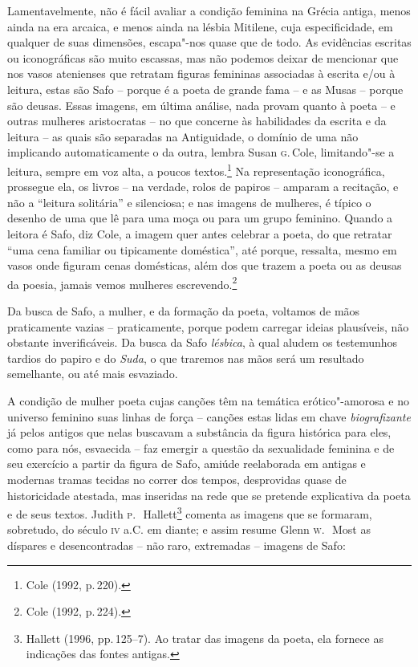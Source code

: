 Lamentavelmente, não é fácil avaliar a condição feminina na Grécia
antiga, menos ainda na era arcaica, e menos ainda na lésbia Mitilene, cuja
especificidade, em qualquer de suas dimensões, escapa"-nos quase que
de todo. As evidências escritas ou iconográficas são muito
escassas, mas não podemos deixar de mencionar que nos vasos atenienses que
retratam figuras femininas associadas à escrita e/ou à leitura, estas são Safo
-- porque é a poeta de grande fama -- e as Musas -- porque são deusas.
Essas imagens, em última análise, nada provam quanto à poeta -- e outras mulheres
aristocratas -- no que concerne às habilidades da escrita e da leitura -- as
quais são separadas na Antiguidade, o domínio de uma não implicando
automaticamente o da outra, lembra Susan \textsc{g}.\,Cole, limitando"-se a
leitura, sempre em voz alta, a poucos textos.\footnote{ Cole (1992, p.\,220).} Na representação iconográfica,
prossegue ela, os livros -- na verdade, rolos de papiros -- amparam a
recitação, e não a “leitura solitária” e silenciosa; e nas imagens de mulheres,
é típico o desenho de uma que lê para uma moça ou para um grupo feminino.
Quando a leitora é Safo, diz Cole, a imagem quer antes celebrar a poeta, do que
retratar “uma cena familiar ou tipicamente doméstica”, até porque, ressalta,
mesmo em vasos onde figuram cenas domésticas, além dos que trazem a poeta ou as
deusas da poesia, jamais vemos mulheres escrevendo.\footnote{ Cole (1992, p.\,224).}

Da busca de Safo, a mulher, e da formação da poeta, voltamos de mãos
praticamente vazias -- praticamente, porque podem carregar ideias plausíveis,
não obstante inverificáveis. Da busca da Safo \textit{lésbica}, à qual
aludem os testemunhos tardios do papiro e do \textit{Suda}, o que traremos nas
mãos será um resultado semelhante, ou até mais esvaziado.

A condição de mulher poeta cujas canções têm na temática erótico"-amorosa e no
universo feminino suas linhas de força -- canções estas lidas em chave
\textit{biografizante} já pelos antigos que nelas buscavam a substância da figura
histórica para eles, como para nós, esvaecida -- faz emergir a questão da
sexualidade feminina e de seu exercício a partir da figura de Safo,
amiúde reelaborada em antigas e modernas tramas tecidas no correr dos
tempos, desprovidas quase de historicidade atestada, mas
inseridas na rede que se pretende explicativa da poeta e de seus textos. Judith
\textsc{p}.~\,Hallett\footnote{ Hallett (1996, pp.\,125--7). Ao tratar das
imagens da poeta, ela fornece as indicações das fontes antigas.} comenta as
imagens que se formaram, sobretudo, do século \textsc{iv} a.C. em diante; e assim resume
Glenn \textsc{w}.~\,Most as díspares e desencontradas -- não raro,
extremadas -- imagens de Safo: 

